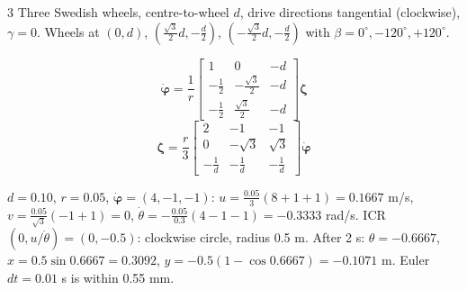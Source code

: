 \begin{multicols}{3}
Three Swedish wheels, centre-to-wheel $d$, drive directions tangential (clockwise), $\gamma=0$. Wheels at $(0,d)$, $(\tfrac{\sqrt3}2d,-\tfrac d2)$, $(-\tfrac{\sqrt3}2d,-\tfrac d2)$ with $\beta=0^\circ,-120^\circ,+120^\circ$.
\begin{fbx}
\[\dot{\boldsymbol\varphi}=\frac1r\begin{bmatrix}1&0&-d\\-\tfrac12&-\tfrac{\sqrt3}2&-d\\-\tfrac12&\tfrac{\sqrt3}2&-d\end{bmatrix}\boldsymbol\zeta\]
\[\boldsymbol\zeta=\frac r3\begin{bmatrix}2&-1&-1\\0&-\sqrt3&\sqrt3\\-\tfrac1d&-\tfrac1d&-\tfrac1d\end{bmatrix}\dot{\boldsymbol\varphi}\]
\end{fbx}
\begin{worked}
$d=0.10$, $r=0.05$, $\dot{\boldsymbol\varphi}=(4,-1,-1)$: $u=\tfrac{0.05}3(8+1+1)=0.1667$ m/s, $v=\tfrac{0.05}{\sqrt3}(-1+1)=0$, $\dot\theta=-\tfrac{0.05}{0.3}(4-1-1)=-0.3333$ rad/s. ICR $(0,u/\dot\theta)=(0,-0.5)$: clockwise circle, radius 0.5 m. After 2 s: $\theta=-0.6667$, $x=0.5\sin0.6667=0.3092$, $y=-0.5(1-\cos0.6667)=-0.1071$ m. Euler $dt=0.01$ s is within 0.55 mm. \chk
\end{worked}


\end{multicols}
